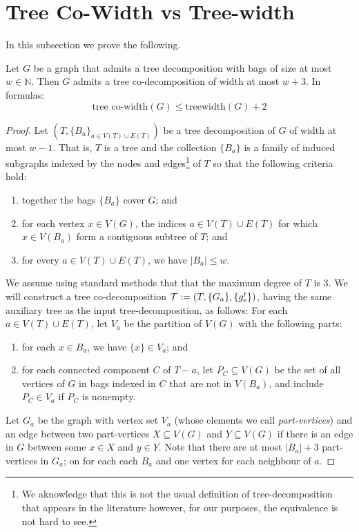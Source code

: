 \section{Tree Co-Width vs Tree-width}\label{appendix:tree-co-vs-tree}
In this subsection we prove the following.
\begin{lemma}
    Let $G$ be a graph that admits a tree decomposition with bags of size at most $w\in\mathbb N$. Then $G$ admits a tree co-decomposition of width at most $w+3$. In formulas:
    \[
    \text{tree co-width}(G)\le \text{treewidth}(G)+2
    \]
\end{lemma}
\begin{proof}
    Let $(T,\{B_a\}_{a\in V(T)\cup E(T)})$ be a tree decomposition of $G$ of width at most $w-1$. That is, $T$ is a tree and the collection $\{B_a\}$ is a family of induced subgraphs indexed by the nodes and edges\footnote{We aknowledge that this is not the usual definition of tree-decomposition that appears in the literature however, for our purposes, the equivalence is not hard to see.} of $T$ so that the following criteria hold:\vspace{-.25cm}
    \begin{enumerate}
        \item together the bags $\{B_a\}$ cover $G$; and\vspace{-.25cm}
        \item for each vertex $x\in V(G)$, the indices $a\in V(T)\cup E(T)$ for which $x\in V(B_a)$ form a contiguous subtree of $T$; and\vspace{-.25cm}
        \item for every $a\in V(T)\cup E(T)$, we have $|B_a|\le w$.\vspace{-.25cm}
    \end{enumerate}
    We assume using standard methods that that the maximum degree of $T$ is $3$. We will construct a tree co-decomposition $\operatorname{\mathcal{T}}:=(T,\{G_a\},\{g_e^t\})$, having the same auxiliary tree as the input tree-decomposition, as follows: For each $a\in V(T)\cup E(T)$, let $V_a$ be the partition of $V(G)$ with the following parts:\vspace{-.25cm}
    \begin{enumerate}
        \item for each $x\in B_a$, we have $\{x\}\in V_a$; and\vspace{-.25cm}
        \item for each connected component $C$ of $T-a$, let $P_C\subseteq V(G)$ be the set of all vertices of $G$ in bags indexed in $C$ that are not in $V(B_a)$, and include $P_C\in V_a$ if $P_C$ is nonempty.\vspace{-.25cm}
    \end{enumerate}
    Let $G_a$ be the graph with vertex set $V_a$ (whose elements we call \emph{part-vertices}) and an edge between two part-vertices $X\subseteq V(G)$ and $Y\subseteq V(G)$ if there is an edge in $G$ between some $x\in X$ and $y\in Y$. Note that there are at most $|B_a|+3$ part-vertices in $G_a$; on for each each $B_a$ and one vertex for each neighbour of $a$.


\end{proof}
